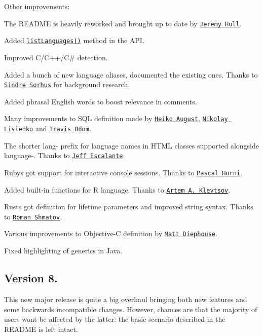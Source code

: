 Other improvements\+:


\begin{DoxyItemize}
\item The R\+E\+A\+D\+ME is heavily reworked and brought up to date by \href{https://github.com/sourrust}{\tt Jeremy Hull}.
\item Added \href{http://highlightjs.readthedocs.org/en/latest/api.html#listlanguages}{\tt {\ttfamily list\+Languages()}} method in the A\+PI.
\item Improved C/\+C++/C\# detection.
\item Added a bunch of new language aliases, documented the existing ones. Thanks to \href{https://github.com/sindresorhus}{\tt Sindre Sorhus} for background research.
\item Added phrasal English words to boost relevance in comments.
\item Many improvements to S\+QL definition made by \href{https://github.com/auge8472}{\tt Heiko August}, \href{https://github.com/neor-ru}{\tt Nikolay Lisienko} and \href{https://github.com/Burstaholic}{\tt Travis Odom}.
\item The shorter {\ttfamily lang-\/} prefix for language names in H\+T\+ML classes supported alongside {\ttfamily language-\/}. Thanks to \href{https://github.com/jenius}{\tt Jeff Escalante}.
\item Ruby\textquotesingle{}s got support for interactive console sessions. Thanks to \href{https://github.com/phurni}{\tt Pascal Hurni}.
\item Added built-\/in functions for R language. Thanks to \href{https://github.com/unikum}{\tt Artem A. Klevtsov}.
\item Rust\textquotesingle{}s got definition for lifetime parameters and improved string syntax. Thanks to \href{https://github.com/shmatov}{\tt Roman Shmatov}.
\item Various improvements to Objective-\/C definition by \href{https://github.com/mdiep}{\tt Matt Diephouse}.
\item Fixed highlighting of generics in Java.
\end{DoxyItemize}

\subsection*{Version 8.}

This new major release is quite a big overhaul bringing both new features and some backwards incompatible changes. However, chances are that the majority of users won\textquotesingle{}t be affected by the latter\+: the basic scenario described in the R\+E\+A\+D\+ME is left intact.

